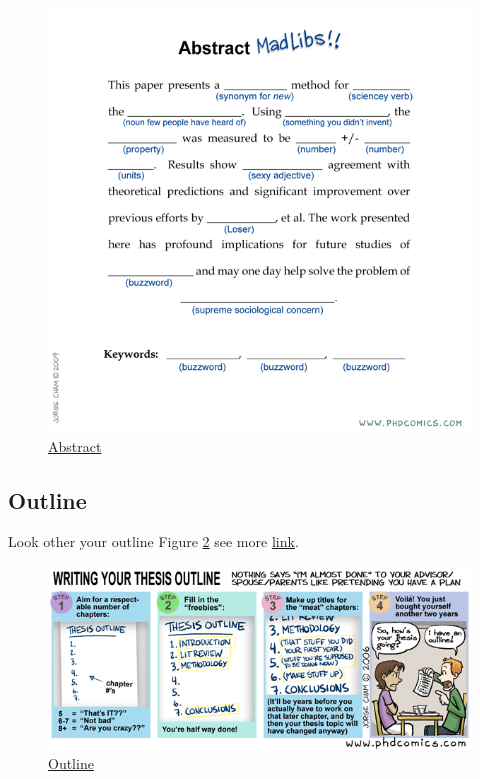 \begin{figure}[H]
    \centering
    \includegraphics[scale=0.9]{Figures/phd-abstract.png}
    \caption[Abstract]{\href{https://phdcomics.com/comics/archive_print.php?comicid=1121}{Abstract}}
    \label{fig:phd-abstract.png}
\end{figure}

\subsection{Outline}

\par Look other your outline Figure \ref{fig:phd-outline.png} see more \href{http://phdcomics.com/comics/archive.php?comicid=715}{link}.

\begin{figure}[H]
    \centering
    \includegraphics[scale=0.9]{Figures/phd-outline.png}
    \caption[Outline]{\href{http://phdcomics.com/comics/archive.php?comicid=715}{Outline}}
    \label{fig:phd-outline.png}
\end{figure}

